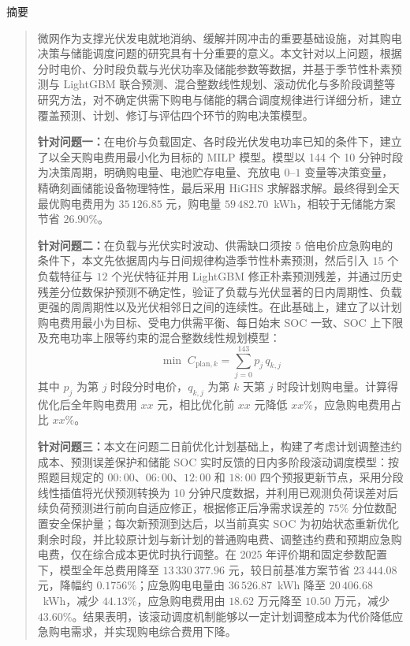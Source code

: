 \documentclass[12pt,a4paper]{article}
\begin{document}
\begin{center}
    {\heiti 摘\quad 要}\\[1.2ex]
\end{center}

\begin{quotation}
\noindent
微网作为支撑光伏发电就地消纳、缓解并网冲击的重要基础设施，对其购电决策与储能调度问题的研究具有十分重要的意义。本文针对以上问题，根据分时电价、分时段负载与光伏功率及储能参数等数据，并基于季节性朴素预测与 LightGBM 联合预测、混合整数线性规划、滚动优化与多阶段调整等研究方法，对不确定供需下购电与储能的耦合调度规律进行详细分析，建立覆盖预测、计划、修订与评估四个环节的购电决策模型。

\medskip
\noindent\textbf{针对问题一：}在电价与负载固定、各时段光伏发电功率已知的条件下，建立了以全天购电费用最小化为目标的 MILP 模型。模型以 144 个 10 分钟时段为决策周期，明确购电量、电池贮存电量、充放电 $0$--$1$ 变量等决策变量，精确刻画储能设备物理特性，最后采用 HiGHS 求解器求解。最终得到全天最优购电费用为 $35\,126.85$ 元，购电量 $59\,482.70$~kWh，相较于无储能方案节省 $26.90\%$。

\medskip
\noindent\textbf{针对问题二：}在负载与光伏实时波动、供需缺口须按 $5$ 倍电价应急购电的条件下，本文先依据周内与日间规律构造季节性朴素预测，然后引入 $15$ 个负载特征与 $12$ 个光伏特征并用 LightGBM 修正朴素预测残差，并通过历史残差分位数保护预测不确定性，验证了负载与光伏显著的日内周期性、负载更强的周周期性以及光伏相邻日之间的连续性。在此基础上，建立了以计划购电费用最小为目标、受电力供需平衡、每日始末 SOC 一致、SOC 上下限及充电功率上限等约束的混合整数线性规划模型：
\begin{equation*}
\boxed{\;\min\; C_{\mathrm{plan},k}=\sum_{j=0}^{143} p_j\,q_{k,j}\;}
\end{equation*}
其中 $p_j$ 为第 $j$ 时段分时电价，$q_{k,j}$ 为第 $k$ 天第 $j$ 时段计划购电量。计算得优化后全年购电费用 $xx$ 元，相比优化前 $xx$ 元降低 $xx\%$，应急购电费用占比 $xx\%$。

\medskip
\noindent\textbf{针对问题三：}本文在问题二日前优化计划基础上，构建了考虑计划调整违约成本、预测误差保护和储能 SOC 实时反馈的日内多阶段滚动调度模型：按照题目规定的 $00{:}00$、$06{:}00$、$12{:}00$ 和 $18{:}00$ 四个预报更新节点，采用分段线性插值将光伏预测转换为 10 分钟尺度数据，并利用已观测负荷误差对后续负荷预测进行前向自适应修正，根据修正后净需求误差的 $75\%$ 分位数配置安全保护量；每次新预测到达后，以当前真实 SOC 为初始状态重新优化剩余时段，并比较原计划与新计划的普通购电费、调整违约费和预期应急购电费，仅在综合成本更优时执行调整。在 2025 年评价期和固定参数配置下，模型全年总费用降至 $13\,330\,377.96$ 元，较日前基准方案节省 $23\,444.08$ 元，降幅约 $0.1756\%$；应急购电电量由 $36\,526.87$~kWh 降至 $20\,406.68$~kWh，减少 $44.13\%$，应急购电费用由 $18.62$ 万元降至 $10.50$ 万元，减少 $43.60\%$。结果表明，该滚动调度机制能够以一定计划调整成本为代价降低应急购电需求，并实现购电综合费用下降。


\end{quotation}
\end{document}
